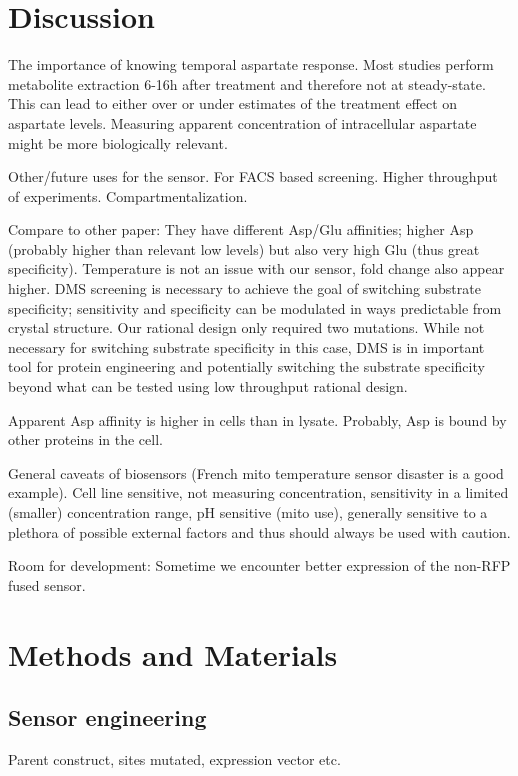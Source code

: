 \documentclass[9pt,lineno]{elife}
\begin{document}
\section{Discussion}
The importance of knowing temporal aspartate response.
Most studies perform metabolite extraction 6-16h after treatment and therefore not at steady-state.
This can lead to either over or under estimates of the treatment effect on aspartate levels.
Measuring apparent concentration of intracellular aspartate might be more biologically relevant.


Other/future uses for the sensor.
For FACS based screening.
Higher throughput of experiments.
Compartmentalization.


Compare to other paper:
They have different Asp/Glu affinities; higher Asp (probably higher than relevant low levels) but also very high Glu (thus great specificity).
Temperature is not an issue with our sensor, fold change also appear higher.
DMS screening is necessary to achieve the goal of switching substrate specificity; sensitivity and specificity can be modulated in ways predictable from crystal structure.
Our rational design only required two mutations.
While not necessary for switching substrate specificity in this case, DMS is in important tool for protein engineering and potentially switching the substrate specificity beyond what can be tested using low throughput rational design.

Apparent Asp affinity is higher in cells than in lysate.
Probably, Asp is bound by other proteins in the cell.

General caveats of biosensors (French mito temperature sensor disaster is a good example).
Cell line sensitive, not measuring concentration, sensitivity in a limited (smaller) concentration range, pH sensitive (mito use), generally sensitive to a plethora of possible external factors and thus should always be used with caution.

Room for development:
Sometime we encounter better expression of the non-RFP fused sensor.










\section{Methods and Materials}

\subsection{Sensor engineering}
Parent construct, sites mutated, expression vector etc.
\end{document}
